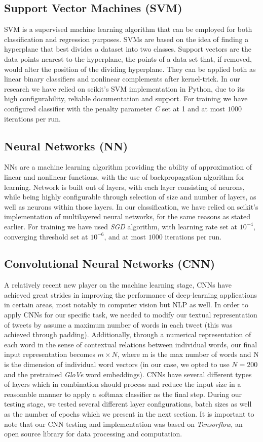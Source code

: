 \documentclass[10pt,conference]{IEEEtran}
\begin{document}
\subsection{Support Vector Machines (SVM)}
SVM is a supervised machine learning algorithm that can be employed for both classification and regression purposes. SVMs are based on the idea of finding a hyperplane that best divides a dataset into two classes. Support vectors are the data points nearest to the hyperplane, the points of a data set that, if removed, would alter the position of the dividing hyperplane. They can be applied both as linear binary classifiers and nonlinear complements after kernel-trick. In our research we have relied on scikit's SVM implementation in Python, due to its high configurability, reliable documentation and support. For training we have configured classifier with the penalty parameter \textit{C} set at 1 and at most $1000$ iterations per run.

\subsection{Neural Networks (NN)}
NNs are a machine learning algorithm providing the ability of approximation of linear and nonlinear functions, with the use of backpropagation algorithm for learning. Network is built out of layers, with each layer consisting of neurons, while being highly configurable through selection of size and number of layers, as well as neurons within those layers. In our classification, we have relied on scikit's implementation of multilayered neural networks, for the same reasons as stated earlier. For training we have used \textit{SGD} algorithm, with learning rate set at $10^{-4}$, converging threshold set at $10^{-6}$, and at most $1000$ iterations per run.

\subsection{Convolutional Neural Networks (CNN)}
A relatively recent new player on the machine learning stage, CNNs have achieved great strides in improving the performance of deep-learning applications in certain areas, most notably in computer vision but NLP as well. In order to apply CNNs for our specific task, we needed to modify our textual representation of tweets by assume a maximum number of words in each tweet (this was achieved through padding). Additionally, through a numerical representation of each word in the sense of contextual relations between individual words, our final input representation becomes $m \times N$, where m is the max number of words and N is the dimension of individual word vectors (in our case, we opted to use $N=200$ and the pretrained \textit{GloVe} word embeddings). CNNs have several different types of layers which in combination should process and reduce the input size in a reasonable manner to apply a softmax classifier as the final step. During our testing stage, we tested several different layer configurations, batch sizes as well as the number of epochs which we present in the next section. It is important to note that our CNN testing and implementation was based on \textit{Tensorflow}, an open source library for data processing and computation.
\end{document}
